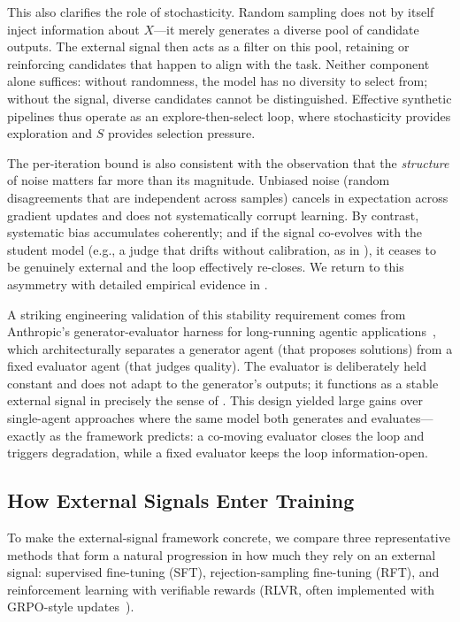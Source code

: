 \documentclass{article}
\theoremstyle{plain}
\theoremstyle{definition}
\theoremstyle{remark}
\begin{document}
This also clarifies the role of stochasticity. Random sampling does not by itself inject information about $X$---it merely generates a diverse pool of candidate outputs. The external signal then acts as a filter on this pool, retaining or reinforcing candidates that happen to align with the task. Neither component alone suffices: without randomness, the model has no diversity to select from; without the signal, diverse candidates cannot be distinguished. Effective synthetic pipelines thus operate as an explore-then-select loop, where stochasticity provides exploration and $S$ provides selection pressure.

The per-iteration bound is also consistent with the observation that the \textit{structure} of noise matters far more than its magnitude. Unbiased noise (random disagreements that are independent across samples) cancels in expectation across gradient updates and does not systematically corrupt learning. By contrast, systematic bias accumulates coherently; and if the signal co-evolves with the student model (e.g., a judge that drifts without calibration, as in ), it ceases to be genuinely external and the loop effectively re-closes. We return to this asymmetry with detailed empirical evidence in .

A striking engineering validation of this stability requirement comes from Anthropic's generator-evaluator harness for long-running agentic applications~\cite{rajasekaranHarnessDesignLongrunning2026}, which architecturally separates a generator agent (that proposes solutions) from a fixed evaluator agent (that judges quality). The evaluator is deliberately held constant and does not adapt to the generator's outputs; it functions as a stable external signal in precisely the sense of . This design yielded large gains over single-agent approaches where the same model both generates and evaluates---exactly as the framework predicts: a co-moving evaluator closes the loop and triggers degradation, while a fixed evaluator keeps the loop information-open.

\subsection{How External Signals Enter Training}

To make the external-signal framework concrete, we compare three representative methods that form a natural progression in how much they rely on an external signal: supervised fine-tuning (SFT), rejection-sampling fine-tuning (RFT), and reinforcement learning with verifiable rewards (RLVR, often implemented with GRPO-style updates~\cite{shaoDeepSeekMathPushingLimits2024}).
\end{document}
